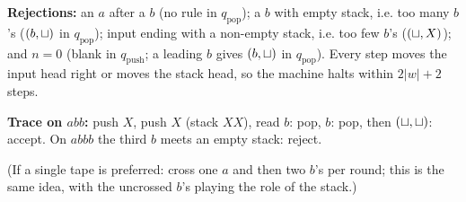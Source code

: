 \begin{soln}
\textbf{Rejections:} an $a$ after a $b$ (no rule in $q_{\mathrm{pop}}$); a $b$ with empty stack, i.e. too many $b$'s ($(b,\sqcup)$ in $q_{\mathrm{pop}}$); input ending with a non-empty stack, i.e. too few $b$'s ($(\sqcup,X)$); and $n=0$ (blank in $q_{\mathrm{push}}$; a leading $b$ gives $(b,\sqcup)$ in $q_{\mathrm{pop}}$). Every step moves the input head right or moves the stack head, so the machine halts within $2|w|+2$ steps.

\textbf{Trace on $abb$:} push $X$, push $X$ (stack $XX$), read $b$: pop, $b$: pop, then $(\sqcup,\sqcup)$: accept. On $abbb$ the third $b$ meets an empty stack: reject.

(If a single tape is preferred: cross one $a$ and then two $b$'s per round; this is the same idea, with the uncrossed $b$'s playing the role of the stack.)
\end{soln}

